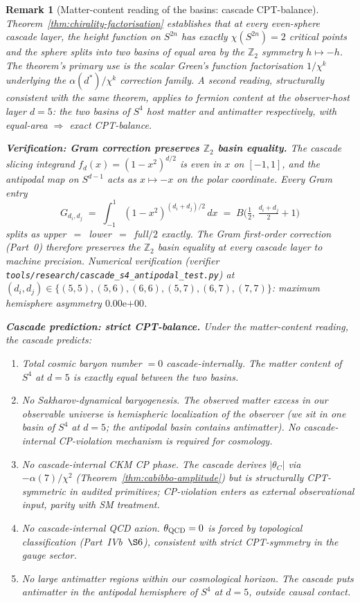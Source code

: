\documentclass[12pt,a4paper]{article}
\newtheorem*{remark}{Remark}
\begin{document}
\begin{remark}[Matter-content reading of the basins: cascade CPT-balance]\label{rem:cpt-balance-basins}
Theorem~\ref{thm:chirality-factorisation} establishes that at every even-sphere cascade layer, the height function on $S^{2n}$ has exactly $\chi(S^{2n})=2$ critical points and the sphere splits into two basins of \emph{equal area} by the $\mathbb{Z}_2$ symmetry $h\mapsto -h$. The theorem's primary use is the scalar Green's function factorisation $1/\chi^k$ underlying the $\alpha(d^*)/\chi^k$ correction family. A second reading, structurally consistent with the same theorem, applies to fermion content at the observer-host layer $d=5$: the two basins of $S^4$ host matter and antimatter respectively, with equal-area $\Rightarrow$ exact CPT-balance.

\medskip\noindent\textbf{Verification: Gram correction preserves $\mathbb{Z}_2$ basin equality.}
The cascade slicing integrand $f_d(x)=(1-x^2)^{d/2}$ is even in $x$ on $[-1,1]$, and the antipodal map on $S^{d-1}$ acts as $x\mapsto -x$ on the polar coordinate. Every Gram entry
\[
G_{d_i,d_j} \;=\; \int_{-1}^{1}(1-x^2)^{(d_i+d_j)/2}\,dx \;=\; B\!\bigl(\tfrac{1}{2},\,\tfrac{d_i+d_j}{2}+1\bigr)
\]
splits as upper~$=$~lower~$=$~full$/2$ exactly. The Gram first-order correction (Part~0) therefore preserves the $\mathbb{Z}_2$ basin equality at every cascade layer to machine precision. Numerical verification (verifier
\texttt{tools/research/cascade\_s4\_antipodal\_test.py}) at $(d_i,d_j)\in\{(5,5),(5,6),(6,6),(5,7),(6,7),(7,7)\}$: maximum hemisphere asymmetry $0.00\mathrm{e}{+00}$.

\medskip\noindent\textbf{Cascade prediction: strict CPT-balance.}
Under the matter-content reading, the cascade predicts:
\begin{enumerate}[label=(\alph*),nosep]
\item Total cosmic baryon number $=0$ cascade-internally. The matter content of $S^4$ at $d=5$ is exactly equal between the two basins.
\item No Sakharov-dynamical baryogenesis. The observed matter excess in our observable universe is \emph{hemispheric localization} of the observer (we sit in one basin of $S^4$ at $d=5$; the antipodal basin contains antimatter). No cascade-internal CP-violation mechanism is required for cosmology.
\item No cascade-internal CKM CP phase. The cascade derives $\lvert\theta_C\rvert$ via $-\alpha(7)/\chi^2$ (Theorem~\ref{thm:cabibbo-amplitude}) but is structurally CPT-symmetric in audited primitives; CP-violation enters as external observational input, parity with SM treatment.
\item No cascade-internal QCD axion. $\theta_{\rm QCD}=0$ is forced by topological classification (Part~IVb~$\S 6$), consistent with strict CPT-symmetry in the gauge sector.
\item No large antimatter regions within our cosmological horizon. The cascade puts antimatter in the antipodal hemisphere of $S^4$ at $d=5$, outside causal contact.
\end{enumerate}


\end{remark}
\end{document}
